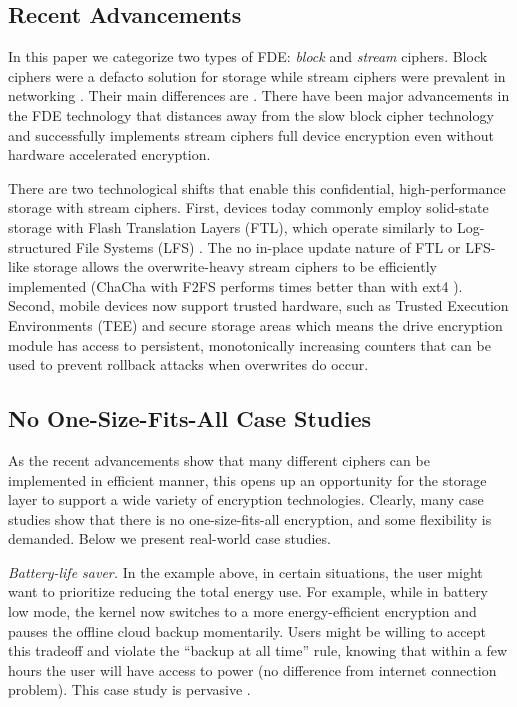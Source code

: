 \subsection{Recent Advancements}

In this paper we categorize two types of FDE: {\em block} and {\em stream}
ciphers. Block ciphers were a defacto solution for storage while stream ciphers
were prevalent in networking . Their main differences are . There have been major advancements in the FDE
technology that distances away from the slow block cipher technology and
successfully implements stream ciphers full device encryption \cite{Adiantum,
StrongBox} even without hardware accelerated encryption.

There are two technological shifts that enable this confidential,
high-performance storage with stream ciphers. First, devices today commonly
employ solid-state storage with Flash Translation Layers (FTL), which operate
similarly to Log-structured File Systems (LFS) \cite{LFS, F2FS, NILFS}. The no
in-place update nature of FTL or LFS-like storage allows the overwrite-heavy
stream ciphers to be efficiently implemented (\eg ChaCha with F2FS performs \xxx
times better than with ext4 \cite{StrongBox}). Second, mobile devices now
support trusted hardware, such as Trusted Execution Environments (TEE)
\cite{TrustZone, TEE} and secure storage areas \cite{eMMC-standard} which means
the drive encryption module has access to persistent, monotonically increasing
counters that can be used to prevent rollback attacks when overwrites do occur.


\subsection{No One-Size-Fits-All Case Studies}

As the recent advancements show that many different ciphers can be implemented
in efficient manner, this opens up an opportunity for the storage layer to
support a wide variety of encryption technologies. Clearly, many case studies
show that there is no one-size-fits-all encryption, and some flexibility is
demanded. Below we present \numCases real-world case studies.

{\em Battery-life saver.} In the example above, in certain situations, the user
might want to prioritize reducing the total energy use. For example, while in
battery low mode, the kernel now switches to a more energy-efficient encryption
and pauses the offline cloud backup momentarily. Users might be willing to
accept this tradeoff and violate the ``backup at all time'' rule, knowing that
within a few hours the user will have access to power (no difference from
internet connection problem). This case study is pervasive \cite{hackernews-???,
many-more??}.


